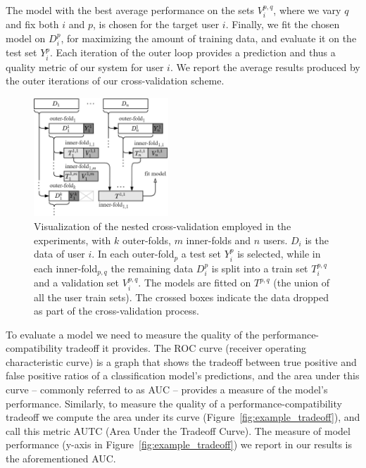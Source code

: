 \documentclass[letterpaper]{article}
\theoremstyle{definition}
\begin{document}
The model with the best average performance on the sets $V_i^{p,q}$, where we vary $q$ and fix both $i$ and $p$, is chosen for the target user $i$.
Finally, we fit the chosen model on $D_i^p$, for maximizing the amount of training data, and evaluate it on the test set $Y_i^p$.
Each iteration of the outer loop provides a prediction and thus a quality metric of our system for user $i$.
We report the average results produced by the outer iterations of our cross-validation scheme.





\begin{figure}[t]
\centering
\includegraphics[width=0.45\textwidth]{cross_validation}
\caption{Visualization of the nested cross-validation employed in the experiments, with $k$ outer-folds, $m$ inner-folds and $n$ users. $D_i$ is the data of user $i$. In each outer-fold$_p$ a test set $Y_i^p$ is selected, while in each inner-fold$_{p,q}$ the remaining data $D_i^p$ is split into a train set $T_i^{p,q}$ and a validation set $V_i^{p,q}$. The models are fitted on $T^{p,q}$ (the union of all the user train sets). The crossed boxes indicate the data dropped as part of the cross-validation process.}
\label{fig:cross_validation}
\end{figure}

To evaluate a model we need to measure the quality of the performance-compatibility tradeoff it provides.
The  ROC curve (receiver operating characteristic curve) is a graph that shows the tradeoff between true positive and false positive ratios of a classification model's predictions, and the area under this curve -- commonly referred to as AUC -- provides a measure of the model's performance.
Similarly, to measure the quality of a performance-compatibility tradeoff we compute the  area under its curve (Figure~\ref{fig:example_tradeoff}), and call this metric AUTC (Area Under the Tradeoff Curve). The measure of model performance (y-axis in Figure~\ref{fig:example_tradeoff}) we report in our results is the aforementioned AUC.
\end{document}
